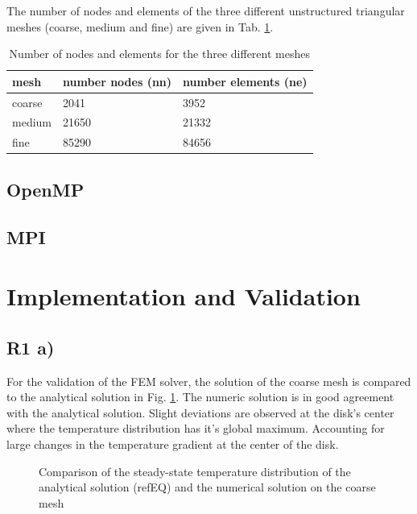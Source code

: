 \documentclass[a4paper, 11pt, oneside]{scrartcl}
\newcommand{\refFig}[1]{Fig. \ref{#1}}
\newcommand{\refTab}[1]{Tab. \ref{#1}}
\begin{document}
The number of nodes and elements of the three different unstructured triangular meshes (coarse, medium and fine) are given in \refTab{tab:Mesh}.
\renewcommand{\arraystretch}{2}
\begin{table}[h!]
	\begin{center}
		\begin{tabular}{ p{2cm} p{1.5cm} p{1.5cm} }
			\hline
			\hline
			mesh & number nodes (nn) & number elements (ne)\\
			\hline
			coarse & 2041 & 3952\\
			\hline
			medium & 21650 & 21332\\
			\hline
			fine & 85290 & 84656\\
			\hline
			\hline
		\end{tabular}
		\caption{\label{tab:Mesh} Number of nodes and elements for the three different meshes}
	\end{center}
\end{table}
\renewcommand{\arraystretch}{1}

\subsection{OpenMP}

\subsection{MPI}

\section{Implementation and Validation}

\subsection{R1 a)}
For the validation of the FEM solver, the solution of the coarse mesh is compared to the analytical solution in \refFig{fig::TemperatureDist}. The numeric solution is in good agreement with the analytical solution. Slight deviations are observed at the disk's center where the temperature distribution has it's global maximum. Accounting for large changes in the temperature gradient at the center of the disk. 

\begin{figure}[!htbp]
	\centering
	\leavevmode
	\resizebox{0.8\width}{!}{}
	\caption{Comparison of the steady-state temperature distribution of the analytical solution (refEQ) and the numerical solution on the coarse mesh}
	\label{fig::TemperatureDist}
\end{figure}
\end{document}
